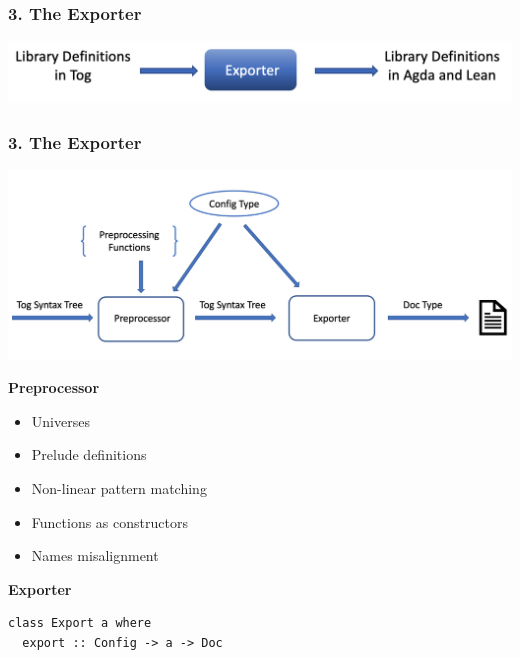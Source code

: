 \documentclass[t,10pt,numbers,fleqn,usenames,xcolor=dvipsnames]{beamer}
\begin{document}
\begin{frame}[fragile] 
\frametitle{3. The Exporter} 
\begin{center}
\includegraphics[scale=0.25]{figures/exporter.png}
\end{center} 
\end{frame}

\begin{frame}[fragile] 
\frametitle{3. The Exporter} 
\includegraphics[scale=0.2]{../figures/exporter_arch.png}
\begin{overprint}
\textbf{Preprocessor}
\begin{itemize}
\item Universes 
\item Prelude definitions 
\item Non-linear pattern matching 
\item Functions as constructors
\item Names misalignment  
\end{itemize}
\textbf{Exporter}
\begin{verbatim} 
class Export a where
  export :: Config -> a -> Doc
\end{verbatim} 
\end{overprint}
\end{frame}
\end{document}
